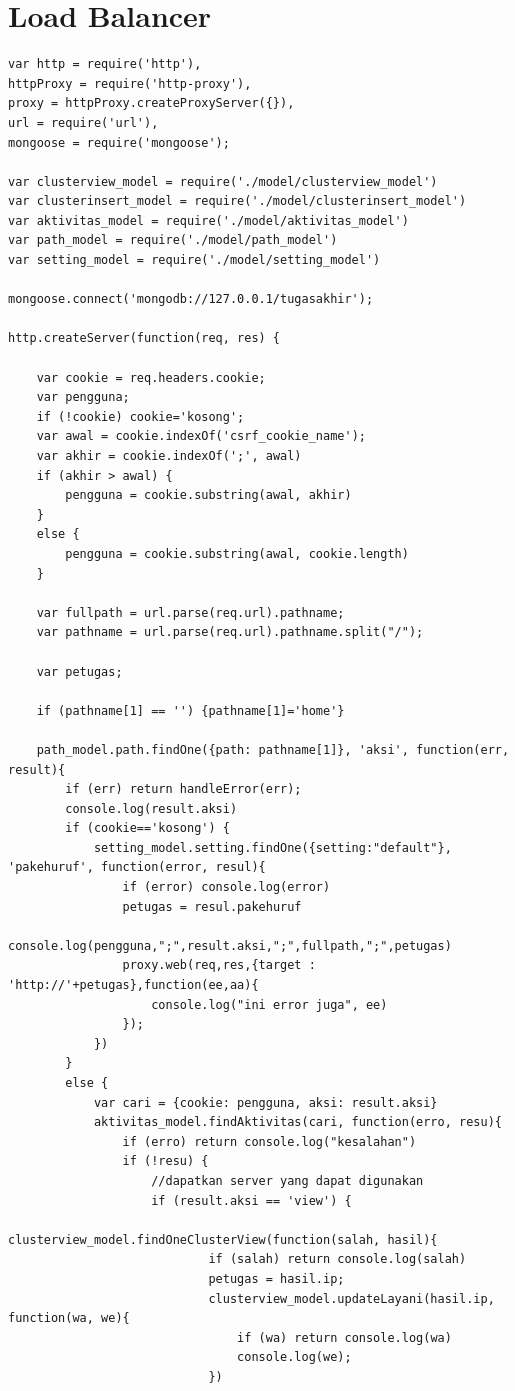 \documentclass{ta-its}
\begin{document}
		\section{Load Balancer}
			\begin{lstlisting}[frame=single,tabsize=2,breaklines,caption={Kode Sumber Lengkap Load Balancer},label=loadBalancer]	
var http = require('http'),
httpProxy = require('http-proxy'),
proxy = httpProxy.createProxyServer({}),
url = require('url'),
mongoose = require('mongoose');

var clusterview_model = require('./model/clusterview_model')
var clusterinsert_model = require('./model/clusterinsert_model')
var aktivitas_model = require('./model/aktivitas_model')
var path_model = require('./model/path_model')
var setting_model = require('./model/setting_model')

mongoose.connect('mongodb://127.0.0.1/tugasakhir');

http.createServer(function(req, res) {

	var cookie = req.headers.cookie;
	var pengguna;
	if (!cookie) cookie='kosong';
	var awal = cookie.indexOf('csrf_cookie_name');
	var akhir = cookie.indexOf(';', awal)
	if (akhir > awal) {
		pengguna = cookie.substring(awal, akhir)
	}
	else {
		pengguna = cookie.substring(awal, cookie.length)
	}
	
	var fullpath = url.parse(req.url).pathname;
	var pathname = url.parse(req.url).pathname.split("/");
	
	var petugas;
				
	if (pathname[1] == '') {pathname[1]='home'}
	
	path_model.path.findOne({path: pathname[1]}, 'aksi', function(err, result){
		if (err) return handleError(err);
		console.log(result.aksi)
		if (cookie=='kosong') {
			setting_model.setting.findOne({setting:"default"}, 'pakehuruf', function(error, resul){
				if (error) console.log(error)				
				petugas = resul.pakehuruf
				console.log(pengguna,";",result.aksi,";",fullpath,";",petugas)
				proxy.web(req,res,{target : 'http://'+petugas},function(ee,aa){
					console.log("ini error juga", ee)
				});
			})
		}
		else {
			var cari = {cookie: pengguna, aksi: result.aksi}
			aktivitas_model.findAktivitas(cari, function(erro, resu){				
				if (erro) return console.log("kesalahan")
				if (!resu) {
					//dapatkan server yang dapat digunakan
					if (result.aksi == 'view') {
						clusterview_model.findOneClusterView(function(salah, hasil){
							if (salah) return console.log(salah)
							petugas = hasil.ip;
							clusterview_model.updateLayani(hasil.ip, function(wa, we){
								if (wa) return console.log(wa)
								console.log(we);
							})
	

\end{lstlisting}
\end{document}
